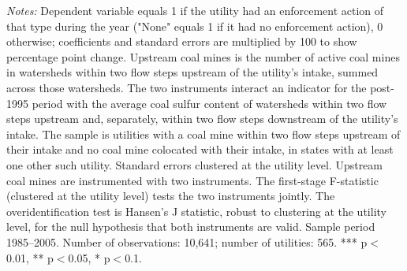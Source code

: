 \begin{table}[htbp]
\begin{minipage}{\linewidth}
\textit{Notes:} Dependent variable equals 1 if the utility had an enforcement action of that type during the year ("None" equals 1 if it had no enforcement action), 0 otherwise; coefficients and standard errors are multiplied by 100 to show percentage point change. Upstream coal mines is the number of active coal mines in watersheds within two flow steps upstream of the utility's intake, summed across those watersheds. The two instruments interact an indicator for the post-1995 period with the average coal sulfur content of watersheds within two flow steps upstream and, separately, within two flow steps downstream of the utility's intake. The sample is utilities with a coal mine within two flow steps upstream of their intake and no coal mine colocated with their intake, in states with at least one other such utility. Standard errors clustered at the utility level. Upstream coal mines are instrumented with two instruments. The first-stage F-statistic (clustered at the utility level) tests the two instruments jointly. The overidentification test is Hansen's J statistic, robust to clustering at the utility level, for the null hypothesis that both instruments are valid. Sample period 1985--2005. Number of observations: 10,641; number of utilities: 565. *** p$<$0.01, ** p$<$0.05, * p$<$0.1.
\end{minipage}
\end{table}
